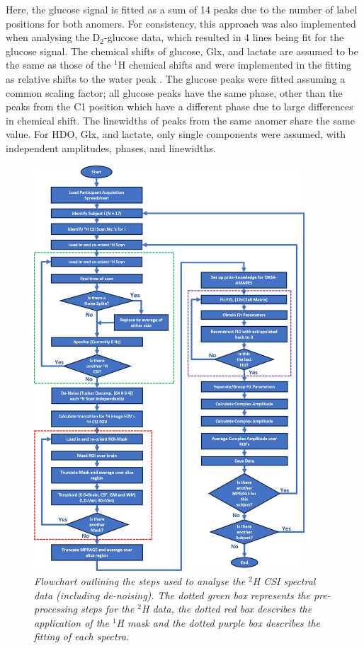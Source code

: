 Here, the glucose signal is fitted as a sum of 14 peaks due to the number of label positions for both anomers. For consistency, this approach was also implemented when analysing the D$_2$-glucose data, which resulted in 4 lines being fit for the glucose signal. The chemical shifts of glucose, Glx, and lactate are assumed to be the same as those of the $^1$H chemical shifts \cite{Govindaraju2000ProtonMetabolites} and were implemented in the fitting as relative shifts to the water peak \cite{Meerwaldt2023InImaging}. The glucose peaks were fitted assuming a common scaling factor; all glucose peaks have the same phase, other than the peaks from the C1 position which have a different phase due to large differences in chemical shift. The linewidths of peaks from the same anomer share the same value. For \ac{HDO}, Glx, and lactate, only single components were assumed, with independent amplitudes, phases, and linewidths.

\begin{figure}
    \centering
    \includegraphics[width = 0.9\textwidth]{Figures/Glucose/2H_Flow.png}
    \caption{\textit{Flowchart outlining the steps used to analyse the $^2$H \ac{CSI} spectral data (including de-noising). The dotted green box represents the pre-processing steps for the $^2$H data, the dotted red box describes the application of the $^1$H mask and the dotted purple box describes the fitting of each spectra.}}
    \label{fig:Glu:2H_Flow}
\end{figure}

